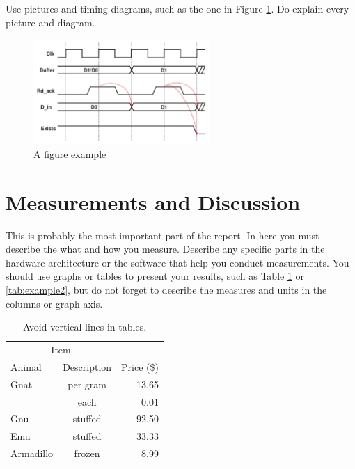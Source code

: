 \documentclass[11pt]{article}
\begin{document}
Use pictures and timing diagrams, such as the one in Figure \ref{fig:example}. Do explain every picture and diagram.

\begin{figure}[!htb]
   \centering
   \includegraphics[width=0.6\textwidth]{example} 
   \caption{A figure example}
   \label{fig:example}
\end{figure}

\section{Measurements and Discussion}
This is probably the most important part of the report. In here you must describe the what and how you measure. Describe any specific parts in the hardware architecture or the software that help you conduct measurements. You should use graphs or tables to present your results, such as Table \ref{tab:example} or \ref{tab:example2}, but do not forget to describe the measures and units in the columns or graph axis.

\begin{table}[htbp]
   \centering
   \begin{tabular}{@{} lcr @{}} %
      \toprule
      \multicolumn{2}{c}{Item} \\
      \cmidrule(r){1-2} %
      Animal    & Description & Price (\$)\\
      \midrule
      Gnat      & per gram & 13.65 \\
                & each     &  0.01 \\
      Gnu       & stuffed  & 92.50 \\
      Emu       & stuffed  & 33.33 \\
      Armadillo & frozen   &  8.99 \\
      \bottomrule
   \end{tabular}
   \caption{Avoid vertical lines in tables.}
   \label{tab:example}
\end{table}
\end{document}

